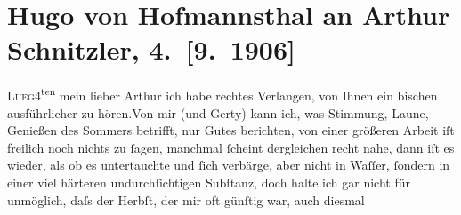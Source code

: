 

         
         \renewcommand{\erwaehntePersonen}{Personen: Otto Brahm, Hugo von Hofmannsthal, Gertrude von Hofmannsthal, Raimund von Hofmannsthal, Franz von Hofmannsthal, Christiane Zimmer}
         \renewcommand{\erwaehnteOrte}{Orte: Lueg am Wolfgangsee, Rodaun, Semmering, St. Gilgen, Wien}
         \renewcommand{\erwaehnteWerke}{}
               \section[Hugo von Hofmannsthal an Arthur Schnitzler, 4. {[}9. 1906{]}]{ Hugo von Hofmannsthal an Arthur Schnitzler, 4. {[}9. 1906{]}}\nopagebreak{}\rehead{ }\begin{ledgroupsized}[t]{13cm}\normalsize\beginnumbering \toendnotes[C]{\smallbreak\pagebreak[2]} 
\toendnotes[C]{\smallbreak}\pstart
           \raggedleft{}{\pb}\textsc{Lueg}4\textsuperscript{ten}\pend
           \pstart{}mein lieber Arthur \pend\pstart
           ich habe rechtes Verlangen, von Ihnen ein bischen ausführlicher zu hören.\hspace*{1.5em}Von mir (und Gerty) kann ich, was Stimmung, Laune, Genießen des Sommers betrifft, nur
               Gutes berichten, von einer größeren Arbeit iſt freilich noch nichts zu ſagen,
               manchmal {\pb}ſcheint dergleichen
               recht nahe, dann iſt es wieder, als ob es untertauchte und ſich verbärge, aber nicht
               in Waſſer, ſondern in einer viel härteren undurchſichtigen Subſtanz, doch halte ich
               gar nicht für unmöglich, daſs der Herbſt, der mir oft günſtig war, auch diesmal

\end{ledgroupsized}
